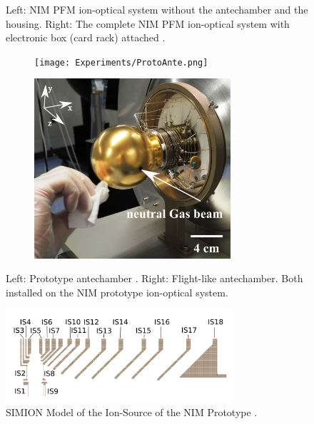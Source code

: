 \begin{figure}[h]
\begin{subfigure}{0.5\textwidth}
		\end{subfigure}
		\caption{Left: NIM PFM ion-optical system without the antechamber and the housing. Right: The complete NIM PFM ion-optical system with electronic box (card rack) attached \cite{Foehn2021}.}
		\label{fig:SetupPFM}
	\end{figure}
	\begin{figure}[h!] %
		\begin{subfigure}{0.5\textwidth}
			\centering
			\texttt{[image: Experiments/ProtoAnte.png]}
		\end{subfigure}
		\begin{subfigure}{0.5\textwidth}
			\centering
			\includegraphics[width = 0.8\textwidth]{Experiments/FlightAnte.png}
		\end{subfigure}
		\caption{Left: Prototype antechamber \cite{Diss_Meyer}. Right: Flight-like antechamber. Both installed on the NIM prototype ion-optical system.}
		\label{fig:SetupAntecham}
	\end{figure}
	\begin{figure}[h] %
		\centering
		\includegraphics[width= 0.75\textwidth]{Setup/Proto_IS_sim.png}
		\caption{SIMION Model of the Ion-Source of the NIM Prototype \cite{Diss_Meyer}.}
		\label{fig:SetupProtoISSim}
	\end{figure}
